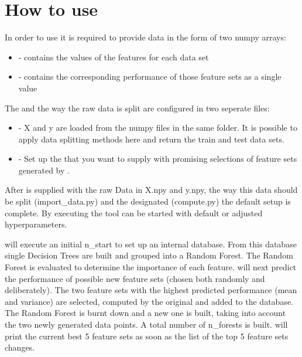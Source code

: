 \documentclass[letterpaper,10pt,english]{sphinxmanual}
\begin{document}
\section{How to use}
\label{\detokenize{index:how-to-use}}
In order to use  it is required to provide data in the form of two numpy arrays:
\begin{itemize}
\item {} 
 - contains the values of the features for each data set

\item {} 
 - contains the corresponding performance of those feature sets as a single value

\end{itemize}

The {\hyperref[\detokenize{Overview:mla}]{}} and the way the raw data is split are configured in two seperate files:
\begin{itemize}
\item {} 
{\hyperref[\detokenize{Importing_Data:import-data}]{}} - X and y are loaded from the numpy files in the same folder. 
It is possible to apply data splitting methods here and return the train and test data sets.

\item {} 
{\hyperref[\detokenize{Generate_Database:compute}]{}} - Set up the {\hyperref[\detokenize{Overview:mla}]{}} that you want to supply with promising selections of 
feature sets generated by .

\end{itemize}

After  is supplied with the raw Data in X.npy and y.npy, the way this data should be split (import\_data.py)
and the designated {\hyperref[\detokenize{Overview:mla}]{}} (compute.py) the default setup is complete. 
By executing  the tool can be started with default or adjusted hyperparameters.

 will execute an initial n\_start to set up an internal database. 
From this database single Decision Trees are built and grouped into a Random Forest. 
The Random Forest is evaluated to determine the importance of each feature.
 will next predict the performance of possible new feature sets (chosen both randomly and deliberately).
The two feature sets with the highest predicted performance (mean and variance) are selected, computed by the
original {\hyperref[\detokenize{Overview:mla}]{}} and added to the database. 
The Random Forest is burnt down and a new one is built, taking into account the two newly generated data points. 
A total number of n\_forests is built.
 will print the current best 5 feature sets as soon as the list of the top 5 feature sets changes.
\end{document}
